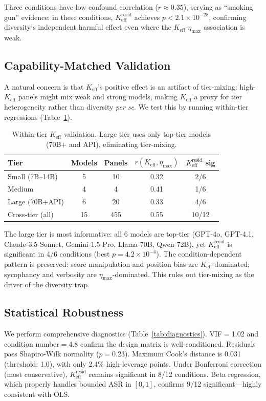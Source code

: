 \documentclass[11pt,a4paper]{article}
\newcommand{\keff}{K_{\text{eff}}}
\newcommand{\etamax}{\eta_{\text{max}}}
\newcommand{\keffresid}{K_{\text{eff}}^{\text{resid}}}
\begin{document}
Three conditions have low confound correlation ($r \approx 0.35$), serving as ``smoking gun'' evidence: in these conditions, $\keffresid$ achieves $p < 2.1 \times 10^{-28}$, confirming diversity's independent harmful effect even where the $\keff$-$\etamax$ association is weak.

\subsection{Capability-Matched Validation}

A natural concern is that $\keff$'s positive effect is an artifact of tier-mixing: high-$\keff$ panels might mix weak and strong models, making $\keff$ a proxy for tier heterogeneity rather than diversity \emph{per se}. We test this by running within-tier regressions (Table~\ref{tab:tier}).

\begin{table}[t]
\centering
\small
\caption{Within-tier $\keff$ validation. Large tier uses only top-tier models (70B+ and API), eliminating tier-mixing.}
\label{tab:tier}
\begin{tabular}{lcccc}
\toprule
Tier & Models & Panels & $r(\keff,\etamax)$ & $\keffresid$ sig \\
\midrule
Small (7B--14B) & 5 & 10 & 0.32 & 2/6 \\
Medium & 4 & 4 & 0.41 & 1/6 \\
Large (70B+API) & 6 & 20 & 0.33 & 4/6 \\
Cross-tier (all) & 15 & 455 & 0.55 & 10/12 \\
\bottomrule
\end{tabular}
\end{table}

The large tier is most informative: all 6 models are top-tier (GPT-4o, GPT-4.1, Claude-3.5-Sonnet, Gemini-1.5-Pro, Llama-70B, Qwen-72B), yet $\keffresid$ is significant in 4/6 conditions (best $p = 4.2 \times 10^{-4}$). The condition-dependent pattern is preserved: score manipulation and position bias are $\keff$-dominated; sycophancy and verbosity are $\etamax$-dominated. This rules out tier-mixing as the driver of the diversity trap.

\subsection{Statistical Robustness}

We perform comprehensive diagnostics (Table~\ref{tab:diagnostics}). VIF$=$1.02 and condition number$=$4.8 confirm the design matrix is well-conditioned. Residuals pass Shapiro-Wilk normality ($p = 0.23$). Maximum Cook's distance is 0.031 (threshold: 1.0), with only 2.4\% high-leverage points. Under Bonferroni correction (most conservative), $\keffresid$ remains significant in 8/12 conditions. Beta regression, which properly handles bounded ASR in $[0,1]$, confirms 9/12 significant---highly consistent with OLS.
\end{document}
